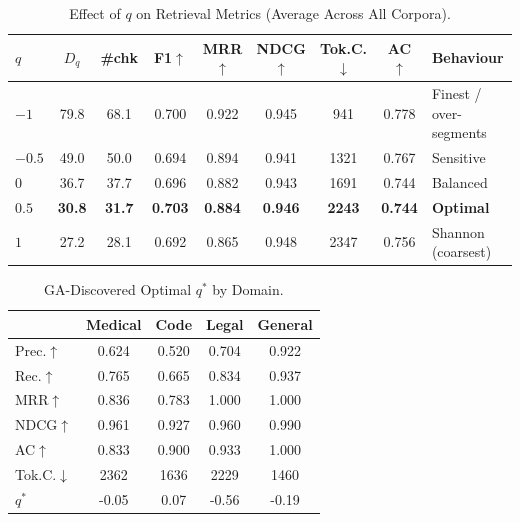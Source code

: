 \begin{table}[t]\centering
\caption{Effect of $q$ on Retrieval Metrics (Average Across All Corpora).}
\label{tab:qsweep}
\begin{tabular}{@{}lcccccccl@{}}\toprule
$q$ & $D_q$ & \#chk & F1$\uparrow$ & MRR$\uparrow$ & NDCG$\uparrow$ & Tok.C.$\downarrow$ & AC$\uparrow$ & Behaviour \\\midrule
$-1$ & 79.8 & 68.1 & 0.700 & 0.922 & 0.945 & 941 & 0.778 & Finest / over-segments \\
$-0.5$ & 49.0 & 50.0 & 0.694 & 0.894 & 0.941 & 1321 & 0.767 & Sensitive \\
$0$ & 36.7 & 37.7 & 0.696 & 0.882 & 0.943 & 1691 & 0.744 & Balanced \\
\textbf{$0.5$} & \textbf{30.8} & \textbf{31.7} & \textbf{0.703} & \textbf{0.884} & \textbf{0.946} & \textbf{2243} & \textbf{0.744} & \textbf{Optimal} \\
$1$ & 27.2 & 28.1 & 0.692 & 0.865 & 0.948 & 2347 & 0.756 & Shannon (coarsest) \\
\bottomrule\end{tabular}\end{table}

\begin{table}[t]\centering
\caption{GA-Discovered Optimal $q^{*}$ by Domain.}
\label{tab:qstar}
\begin{tabular}{@{}lcccc@{}}\toprule
 & \textbf{Medical} & \textbf{Code} & \textbf{Legal} & \textbf{General} \\\midrule
Prec.$\uparrow$ & 0.624 & 0.520 & 0.704 & 0.922 \\
Rec.$\uparrow$ & 0.765 & 0.665 & 0.834 & 0.937 \\
MRR$\uparrow$ & 0.836 & 0.783 & 1.000 & 1.000 \\
NDCG$\uparrow$ & 0.961 & 0.927 & 0.960 & 0.990 \\
AC$\uparrow$ & 0.833 & 0.900 & 0.933 & 1.000 \\
Tok.C.$\downarrow$ & 2362 & 1636 & 2229 & 1460 \\
\midrule $q^{*}$ & -0.05 & 0.07 & -0.56 & -0.19 \\
\bottomrule\end{tabular}\end{table}

